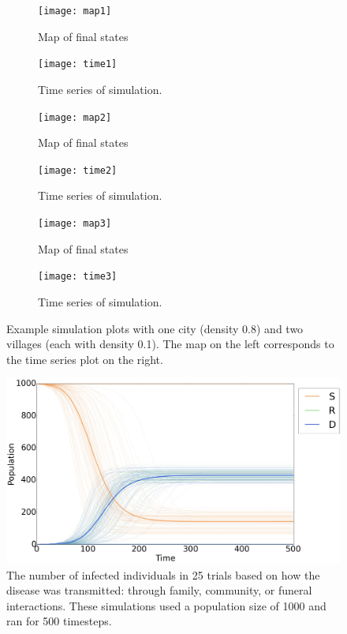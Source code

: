 \begin{figure}
\centering
\begin{subfigure}[t]{0.38\textwidth}
  \texttt{[image: map1]} 
  \caption{Map of final states}
\end{subfigure}
\begin{subfigure}[t]{0.56\textwidth}
  \texttt{[image: time1]}
  \caption{Time series of simulation.}
\end{subfigure}
\begin{subfigure}[t]{0.38\textwidth}
  \texttt{[image: map2]} 
  \caption{Map of final states}
\end{subfigure}
\begin{subfigure}[t]{0.56\textwidth}
  \texttt{[image: time2]}
  \caption{Time series of simulation.}
\end{subfigure}
\begin{subfigure}[t]{0.38\textwidth}
  \texttt{[image: map3]} 
  \caption{Map of final states}
\end{subfigure}
\begin{subfigure}[t]{0.56\textwidth}
  \texttt{[image: time3]}
  \caption{Time series of simulation.}
\end{subfigure}
\caption{Example simulation plots with one city (density 0.8) and two villages (each with density 0.1). The map on the left corresponds to the time series plot on the right.}\label{sabd:ex}
\end{figure}

\begin{figure}
  \centering
  \includegraphics[width=\textwidth]{average-time-series}
  \caption{The number of infected individuals in 25 trials based on how the disease was transmitted: through family, community, or funeral interactions. These simulations used a population size of 1000 and ran for 500 timesteps.}
\end{figure}

